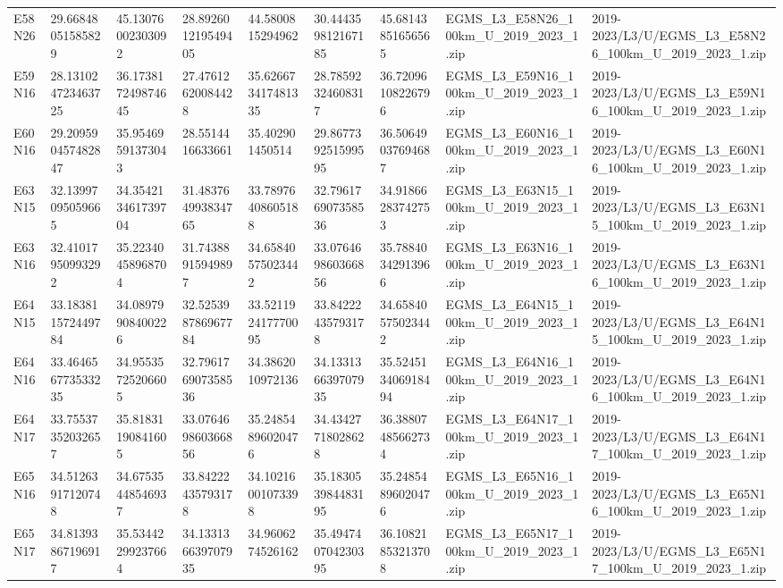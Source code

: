 \begin{landscape}
\begin{longtable}{lllllllll}
E58N26 & 29.66848051585829 & 45.13076002303092 & 28.892601219549405 & 44.5800815294962 & 30.444359812167185 & 45.68143851656565 & EGMS\_L3\_E58N26\_100km\_U\_2019\_2023\_1.zip & 2019-2023/L3/U/EGMS\_L3\_E58N26\_100km\_U\_2019\_2023\_1.zip \\
E59N16 & 28.131024723463725 & 36.173817249874645 & 27.47612620084428 & 35.626673417481335 & 28.78592324608317 & 36.72096108226796 & EGMS\_L3\_E59N16\_100km\_U\_2019\_2023\_1.zip & 2019-2023/L3/U/EGMS\_L3\_E59N16\_100km\_U\_2019\_2023\_1.zip \\
E60N16 & 29.209590457482847 & 35.95469591373043 & 28.5514416633661 & 35.402901450514 & 29.867739251599595 & 36.50649037694687 & EGMS\_L3\_E60N16\_100km\_U\_2019\_2023\_1.zip & 2019-2023/L3/U/EGMS\_L3\_E60N16\_100km\_U\_2019\_2023\_1.zip \\
E63N15 & 32.13997095059665 & 34.354213461739704 & 31.483764993834765 & 33.78976408605188 & 32.796176907358536 & 34.91866283742753 & EGMS\_L3\_E63N15\_100km\_U\_2019\_2023\_1.zip & 2019-2023/L3/U/EGMS\_L3\_E63N15\_100km\_U\_2019\_2023\_1.zip \\
E63N16 & 32.41017950993292 & 35.22340458968704 & 31.74388915949897 & 34.65840575023442 & 33.076469860366856 & 35.78840342913966 & EGMS\_L3\_E63N16\_100km\_U\_2019\_2023\_1.zip & 2019-2023/L3/U/EGMS\_L3\_E63N16\_100km\_U\_2019\_2023\_1.zip \\
E64N15 & 33.183811572449784 & 34.08979908400226 & 32.525398786967784 & 33.521192417770095 & 33.84222435793178 & 34.65840575023442 & EGMS\_L3\_E64N15\_100km\_U\_2019\_2023\_1.zip & 2019-2023/L3/U/EGMS\_L3\_E64N15\_100km\_U\_2019\_2023\_1.zip \\
E64N16 & 33.464656773533235 & 34.95535725206605 & 32.796176907358536 & 34.3862010972136 & 34.133136639707935 & 35.524513406918494 & EGMS\_L3\_E64N16\_100km\_U\_2019\_2023\_1.zip & 2019-2023/L3/U/EGMS\_L3\_E64N16\_100km\_U\_2019\_2023\_1.zip \\
E64N17 & 33.75537352032657 & 35.81831190841605 & 33.076469860366856 & 35.24854896020476 & 34.43427718028628 & 36.38807485662734 & EGMS\_L3\_E64N17\_100km\_U\_2019\_2023\_1.zip & 2019-2023/L3/U/EGMS\_L3\_E64N17\_100km\_U\_2019\_2023\_1.zip \\
E65N16 & 34.51263917120748 & 34.67535448546937 & 33.84222435793178 & 34.10216001073398 & 35.183053984483195 & 35.24854896020476 & EGMS\_L3\_E65N16\_100km\_U\_2019\_2023\_1.zip & 2019-2023/L3/U/EGMS\_L3\_E65N16\_100km\_U\_2019\_2023\_1.zip \\
E65N17 & 34.81393867196917 & 35.53442299237664 & 34.133136639707935 & 34.9606274526162 & 35.494740704230395 & 36.10821853213708 & EGMS\_L3\_E65N17\_100km\_U\_2019\_2023\_1.zip & 2019-2023/L3/U/EGMS\_L3\_E65N17\_100km\_U\_2019\_2023\_1.zip \\
\bottomrule
\end{longtable}
\end{landscape}

